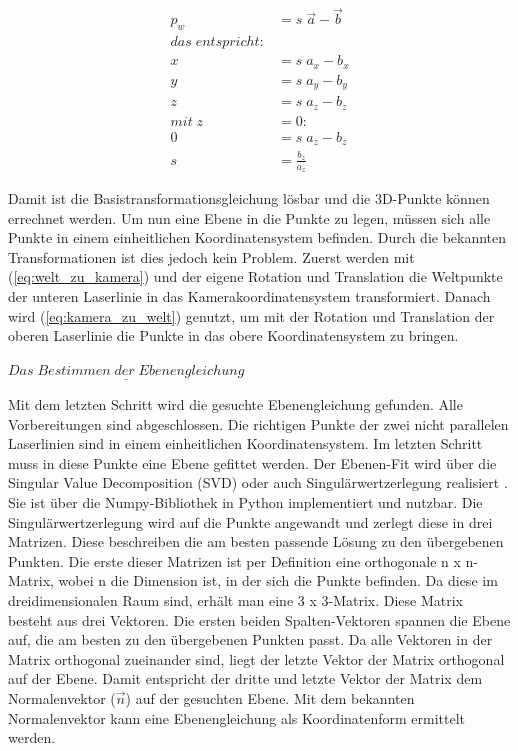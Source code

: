 		\begin{equation}
			\begin{aligned}
				p_w &= s \; \vec{a} - \vec{b} \\
				das \; entspricht: \\
				x &= s \; a_x - b_x \\
				y &= s \; a_y - b_y \\
				z &= s \; a_z - b_z \\
				mit \; z &= 0: \\
				0 &= s \; a_z - b_z \\
				s &= \frac{b_z}{a_z}
			\end{aligned}
		\end{equation}
		
		Damit ist die Basistransformationsgleichung lösbar und die 3D-Punkte können errechnet werden. Um nun eine Ebene in die Punkte zu legen, müssen sich alle Punkte in einem einheitlichen Koordinatensystem befinden. Durch die bekannten Transformationen ist dies jedoch kein Problem. Zuerst werden mit (\ref{eq:welt_zu_kamera}) und der eigene Rotation und Translation die Weltpunkte der unteren Laserlinie in das Kamerakoordinatensystem transformiert. Danach wird (\ref{eq:kamera_zu_welt}) genutzt, um mit der Rotation und Translation der oberen Laserlinie die Punkte in das obere Koordinatensystem zu bringen.
	
		$\underline{Das \; Bestimmen \; der \; Ebenengleichung}$
		
		Mit dem letzten Schritt wird die gesuchte Ebenengleichung gefunden. Alle Vorbereitungen sind abgeschlossen. Die richtigen Punkte der zwei nicht parallelen Laserlinien sind in einem einheitlichen Koordinatensystem. Im letzten Schritt muss in diese Punkte eine Ebene gefittet werden. Der Ebenen-Fit wird über die Singular Value Decomposition (SVD) oder auch Singulärwertzerlegung realisiert \citep[vgl.][S. 349 ff]{liesen_lineare_2021}. Sie ist über die Numpy-Bibliothek in Python implementiert und nutzbar. Die Singulärwertzerlegung wird auf die Punkte angewandt und zerlegt diese in drei Matrizen. Diese beschreiben die am besten passende Lösung zu den übergebenen Punkten. Die erste dieser Matrizen ist per Definition eine orthogonale n x n-Matrix, wobei n die Dimension ist, in der sich die Punkte befinden. Da diese im dreidimensionalen Raum sind, erhält man eine 3 x 3-Matrix. Diese Matrix besteht aus drei Vektoren. Die ersten beiden Spalten-Vektoren spannen die Ebene auf, die am besten zu den übergebenen Punkten passt. Da alle Vektoren in der Matrix orthogonal zueinander sind, liegt der letzte Vektor der Matrix orthogonal auf der Ebene. Damit entspricht der dritte und letzte Vektor der Matrix dem Normalenvektor ($ \vec{n} $) auf der gesuchten Ebene. Mit dem bekannten Normalenvektor kann eine Ebenengleichung als Koordinatenform ermittelt werden. 
		
